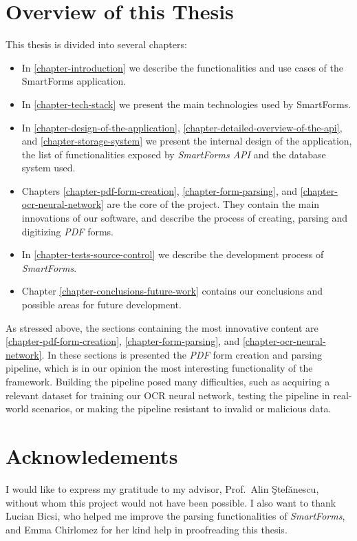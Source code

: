 \documentclass[11pt, a4paper]{report}
\begin{document}
\section{Overview of this Thesis}

This thesis is divided into several chapters:
\begin{itemize}
	\item In \autoref{chapter-introduction} we describe the functionalities and use cases of the SmartForms application.
	\item In \autoref{chapter-tech-stack} we present the main technologies used by SmartForms.
	\item In \autoref{chapter-design-of-the-application}, \autoref{chapter-detailed-overview-of-the-api}, and \autoref{chapter-storage-system} we present the internal design of the application, the list of functionalities exposed by \textit{SmartForms API} and the database system used.
	\item Chapters \ref{chapter-pdf-form-creation}, \ref{chapter-form-parsing}, and \ref{chapter-ocr-neural-network} are the core of the project. They contain the main innovations of our software, and describe the process of creating, parsing and digitizing \textit{PDF} forms.
	\item In \autoref{chapter-tests-source-control} we describe the development process of \textit{SmartForms}.
	\item Chapter \ref{chapter-conclusions-future-work} contains our conclusions and possible areas for future development.
\end{itemize}

As stressed above, the sections containing the most innovative content are  \autoref{chapter-pdf-form-creation}, \autoref{chapter-form-parsing}, and \autoref{chapter-ocr-neural-network}. In these sections is presented the \textit{PDF} form creation and parsing pipeline, which is in our opinion the most interesting functionality of the framework. Building the pipeline posed many difficulties, such as acquiring a relevant dataset for training our OCR neural network, testing the pipeline in real-world scenarios, or making the pipeline resistant to invalid or malicious data. 


\section{Acknowledements}

I would like to express my gratitude to my advisor, Prof.~Alin \c Stef\u anescu, without whom this project would not have been possible. I also want to thank Lucian Bicsi, who helped me improve the parsing functionalities of \textit{SmartForms}, and Emma Chirlomez for her kind help in proofreading this thesis.
\end{document}
